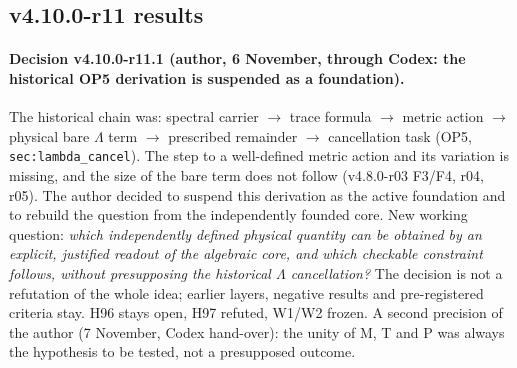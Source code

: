 \subsection*{v4.10.0-r11 results}
\label{subsec:v4100-r11-results}

\paragraph{Decision v4.10.0-r11.1 (author, 6 November, through Codex: the historical OP5 derivation is suspended as a foundation).}
The historical chain was: spectral carrier \(\to\) trace formula \(\to\) metric action \(\to\) physical bare \(\Lambda\) term \(\to\) prescribed remainder \(\to\)
cancellation task (OP5, \texttt{sec:lambda\_cancel}).  The step to a well-defined metric action and its variation is missing, and the size of the bare term does
not follow (v4.8.0-r03 F3/F4, r04, r05).  The author decided to suspend this derivation as the active foundation and to rebuild the question from the
independently founded core.  New working question: \emph{which independently defined physical quantity can be obtained by an explicit, justified readout
of the algebraic core, and which checkable constraint follows, without presupposing the historical \(\Lambda\) cancellation?}  The decision is not a
refutation of the whole idea; earlier layers, negative results and pre-registered criteria stay.  H96 stays open, H97 refuted, W1/W2 frozen.  A
second precision of the author (7 November, Codex hand-over): the unity of M, T and P was always the hypothesis to be tested, not a presupposed outcome.


